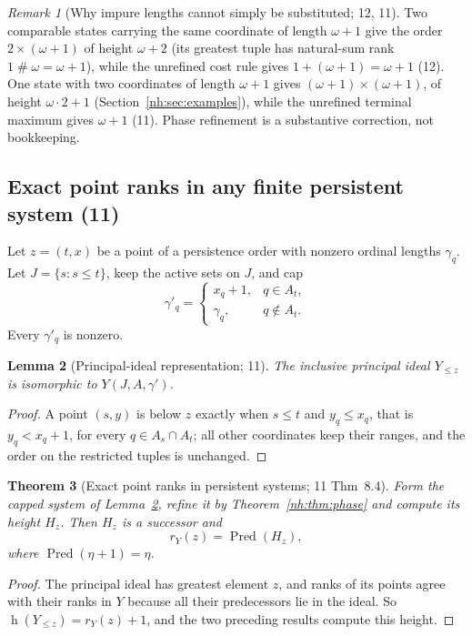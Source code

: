\documentclass[11pt,a4paper]{article}
\newtheorem{theorem}{Theorem}[section]
\newtheorem{lemma}[theorem]{Lemma}
\theoremstyle{definition}
\theoremstyle{remark}
\newtheorem{remark}[theorem]{Remark}
\newcommand{\hgt}{\operatorname{h}}
\newcommand{\ns}{\mathbin{\#}}
\newcommand{\pred}{\operatorname{Pred}}
\begin{document}
\begin{remark}[Why impure lengths cannot simply be substituted; 12, 11]
\label{nh:rem:impure}
Two comparable states carrying the same coordinate of length $\omega+1$ give
the order $2\times(\omega+1)$ of height $\omega+2$ (its greatest tuple has
natural-sum rank $1\ns\omega=\omega+1$), while the unrefined cost rule gives
$1+(\omega+1)=\omega+1$ (12). One state with two coordinates of length
$\omega+1$ gives $(\omega+1)\times(\omega+1)$, of height $\omega\cdot2+1$
(Section~\ref{nh:sec:examples}), while the unrefined terminal maximum gives
$\omega+1$ (11). Phase refinement is a substantive correction, not
bookkeeping.
\end{remark}

\subsection{Exact point ranks in any finite persistent system (11)}

Let $z=(t,x)$ be a point of a persistence order with nonzero ordinal lengths
$\gamma_q$. Let $J=\{s:s\le t\}$, keep the active sets on $J$, and cap
\begin{equation}\label{nh:eq:capped}
 \gamma'_q=\begin{cases}x_q+1,&q\in A_t,\\ \gamma_q,&q\notin A_t.\end{cases}
\end{equation}
Every $\gamma'_q$ is nonzero.

\begin{lemma}[Principal-ideal representation; 11]\label{nh:lem:ideal}
The inclusive principal ideal $Y_{\le z}$ is isomorphic to $Y(J,A,\gamma')$.
\end{lemma}
\begin{proof}
A point $(s,y)$ is below $z$ exactly when $s\le t$ and $y_q\le x_q$, that is
$y_q<x_q+1$, for every $q\in A_s\cap A_t$; all other coordinates keep their
ranges, and the order on the restricted tuples is unchanged.
\end{proof}

\begin{theorem}[Exact point ranks in persistent systems; 11 Thm~8.4]
\label{nh:thm:local}
Form the capped system of Lemma~\ref{nh:lem:ideal}, refine it by
Theorem~\ref{nh:thm:phase} and compute its height $H_z$. Then $H_z$ is a
successor and
\begin{equation}\label{nh:eq:local}
 \boxed{r_Y(z)=\pred(H_z),}
\end{equation}
where $\pred(\eta+1)=\eta$.
\end{theorem}
\begin{proof}
The principal ideal has greatest element $z$, and ranks of its points agree
with their ranks in $Y$ because all their predecessors lie in the ideal. So
$\hgt(Y_{\le z})=r_Y(z)+1$, and the two preceding results compute this height.
\end{proof}
\end{document}
